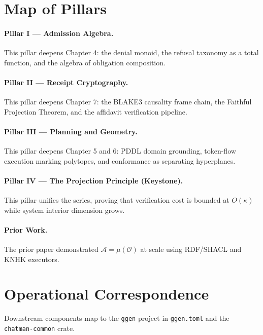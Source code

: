 \documentclass[11pt,oneside]{book}
\theoremstyle{definition}
\theoremstyle{plain}
\theoremstyle{remark}
\newcommand{\Obs}{\mathcal{O}}                 %
\newcommand{\Act}{\mathcal{A}}                 %
\newcommand{\muop}{\mu}                        %
\newcommand{\code}[1]{\texttt{#1}}
\begin{document}
\section{Map of Pillars}

\paragraph{Pillar I --- Admission Algebra.}
This pillar deepens Chapter 4: the denial monoid, the refusal taxonomy as a total function, and the algebra of obligation composition. %

\paragraph{Pillar II --- Receipt Cryptography.}
This pillar deepens Chapter 7: the BLAKE3 causality frame chain, the Faithful Projection Theorem, and the affidavit verification pipeline. %

\paragraph{Pillar III --- Planning and Geometry.}
This pillar deepens Chapter 5 and 6: PDDL domain grounding, token-flow execution marking polytopes, and conformance as separating hyperplanes. %

\paragraph{Pillar IV --- The Projection Principle (Keystone).}
This pillar unifies the series, proving that verification cost is bounded at $O(\kappa)$ while system interior dimension grows. %

\paragraph{Prior Work.}
The prior paper \cite{chatman2025} demonstrated $\Act = \muop(\Obs)$ at scale using RDF/SHACL and KNHK executors. %

\section{Operational Correspondence}
Downstream components map to the \code{ggen} project in \code{ggen.toml} and the \code{chatman-common} crate. %
\end{document}
